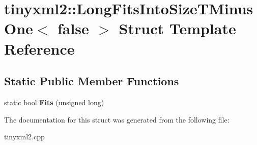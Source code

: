 \hypertarget{structtinyxml2_1_1_long_fits_into_size_t_minus_one_3_01false_01_4}{}\section{tinyxml2\+:\+:Long\+Fits\+Into\+Size\+T\+Minus\+One$<$ false $>$ Struct Template Reference}
\label{structtinyxml2_1_1_long_fits_into_size_t_minus_one_3_01false_01_4}
\subsection*{Static Public Member Functions}
\begin{DoxyCompactItemize}
\item 
\hypertarget{structtinyxml2_1_1_long_fits_into_size_t_minus_one_3_01false_01_4_a29b01087f38a951276df69d358dc0764}{}static bool {\bfseries Fits} (unsigned long)\label{structtinyxml2_1_1_long_fits_into_size_t_minus_one_3_01false_01_4_a29b01087f38a951276df69d358dc0764}

\end{DoxyCompactItemize}


The documentation for this struct was generated from the following file\+:\begin{DoxyCompactItemize}
\item 
tinyxml2.\+cpp\end{DoxyCompactItemize}
